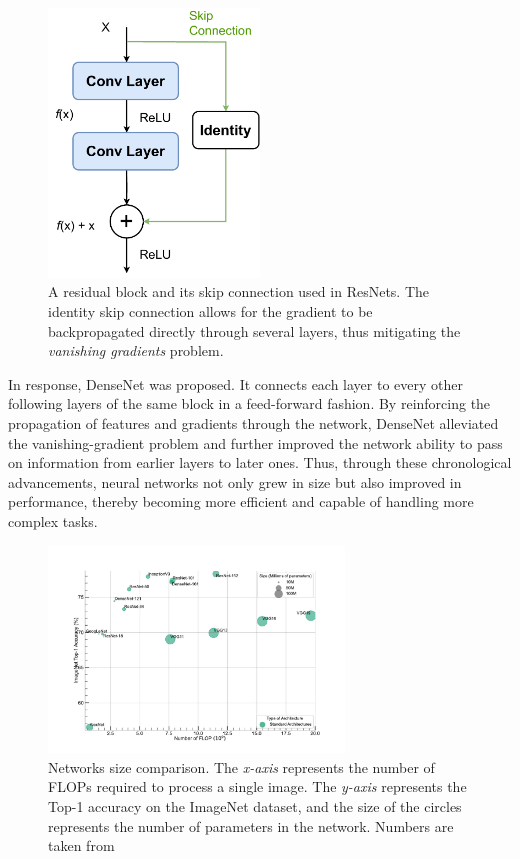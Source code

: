 \begin{figure}[htbp]
  \centering
  \includegraphics[width=0.5\textwidth]{chapter_dlo/assets/skip_connection.pdf}
  \caption{A residual block and its skip connection used in
    ResNets\cite{DBLP:conf/cvpr/HeZRS16}. The identity skip connection allows
    for the gradient to be backpropagated directly through several layers, thus
    mitigating the \emph{vanishing gradients} problem.}
  \label{fig:dlo:skip_connection}
\end{figure}

In response, DenseNet \cite{huang2017densely} was proposed. It connects each
layer to every other following layers of the same block in a feed-forward
fashion. By reinforcing the propagation of features and gradients through the
network, DenseNet alleviated the vanishing-gradient problem and further improved
the network ability to pass on information from earlier layers to later ones.
Thus, through these chronological advancements, neural networks not only grew in
size but also improved in performance, thereby becoming more efficient and
capable of handling more complex tasks.\\

\begin{figure}[htbp]
  \centering
  \includegraphics[width=0.7\textwidth]{chapter_sota/assets/network_sizes_normal.pdf}
  \caption{Networks size comparison. The \emph{x-axis} represents the number
    of \acp{FLOP} required to process a single image. The \emph{y-axis}
    represents the Top-1 accuracy on the ImageNet \cite{deng2009imagenet}
    dataset, and the size of the circles represents the number of parameters in
    the network. Numbers are taken from \cite{pytorch_vision}}
  \label{fig:dlo:net_sizes}
\end{figure}

